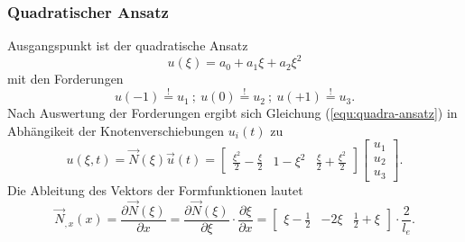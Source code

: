 \documentclass[a4paper,10pt,twoside]{article}
\numberwithin{equation}{section} %
\numberwithin{figure}{section}   %
\numberwithin{table}{section}    %
\begin{document}
	\subsubsection{Quadratischer Ansatz} \label{sec:quadratischer ansatz}
	Ausgangspunkt ist der quadratische Ansatz
	\begin{equation}\label{equ:quadra-ansatz}
	u(\xi) = a_{0} + a_{1} \xi + a_{2} \xi^{2}
	\end{equation}
	mit den Forderungen
	\begin{equation}\label{equ:quadra-ansatz-forderungen}
	u(-1) \overset{!}{=} u_{1} \ ; \ u(0) \overset{!}{=} u_{2} \ ; \ u(+1) \overset{!}{=} u_{3}.
	\end{equation}
	Nach Auswertung der Forderungen ergibt sich Gleichung (\ref{equ:quadra-ansatz}) in Abhängikeit der Knotenverschiebungen $u_{i}(t)$ zu
	\begin{equation}\label{equ:quadra-ansatz-eingestzt}
	u(\xi,t) = \vec{N}(\xi) \vec{u}(t) =
	\left[ 
	\begin{array}{ccc}
	\frac{\xi^{2}}{2}-\frac{\xi}{2} & 1-\xi^{2} & \frac{\xi}{2}+\frac{\xi^{2}}{2}
	\end{array}
	\right] 
	\left[ 
	\begin{array}{c}
	u_{1} \\
	u_{2} \\
	u_{3}
	\end{array}
	\right] .
	\end{equation}
	Die Ableitung des Vektors der Formfunktionen lautet
	\begin{equation}\label{equ:qudra-N-ableitung}
	\vec{N}_{,x}(x) =\frac{\partial \vec{N}(\xi)}{\partial x}= \frac{\partial \vec{N}(\xi)}{\partial \xi} \cdot \frac{\partial \xi}{\partial x} =
	\left[ 
	\begin{array}{ccc}
	\xi - \frac{1}{2} & -2\xi & \frac{1}{2} + \xi
	\end{array}
	\right] \cdot \frac{2}{l_{e}}.
	\end{equation} 
	
\end{document}
